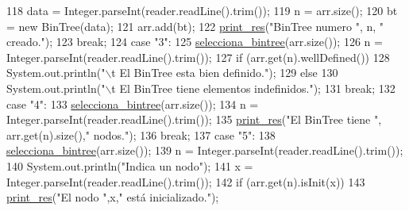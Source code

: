 \begin{DoxyCode}
118                         data = Integer.parseInt(reader.readLine().trim());
119                         n = arr.size();
120                         bt = \textcolor{keyword}{new} BinTree(data);
121                         arr.add(bt);
122                         \hyperlink{classdomini_1_1utils_1_1Driver____BinTree_a434e26afb3eb701558d81b0fd1c29dcb}{print\_res}(\textcolor{stringliteral}{"BinTree numero "}, n, \textcolor{stringliteral}{" creado."});
123                     \textcolor{keywordflow}{break};
124                     \textcolor{keywordflow}{case} \textcolor{stringliteral}{"3"}:
125                         \hyperlink{classdomini_1_1utils_1_1Driver____BinTree_a0d90bf2cb928174547e712140b5a4fe5}{selecciona\_bintree}(arr.size());
126                         n = Integer.parseInt(reader.readLine().trim());
127                         \textcolor{keywordflow}{if} (arr.get(n).wellDefined())
128                             System.out.println(\textcolor{stringliteral}{"\(\backslash\)t El BinTree esta bien definido."});
129                         \textcolor{keywordflow}{else} 
130                             System.out.println(\textcolor{stringliteral}{"\(\backslash\)t El BinTree tiene elementos indefinidos."});
131                     \textcolor{keywordflow}{break};
132                     \textcolor{keywordflow}{case} \textcolor{stringliteral}{"4"}:
133                         \hyperlink{classdomini_1_1utils_1_1Driver____BinTree_a0d90bf2cb928174547e712140b5a4fe5}{selecciona\_bintree}(arr.size());
134                         n = Integer.parseInt(reader.readLine().trim());
135                         \hyperlink{classdomini_1_1utils_1_1Driver____BinTree_a434e26afb3eb701558d81b0fd1c29dcb}{print\_res}(\textcolor{stringliteral}{"El BinTree tiene "}, arr.get(n).size(),\textcolor{stringliteral}{" nodos."});
136                     \textcolor{keywordflow}{break};
137                     \textcolor{keywordflow}{case} \textcolor{stringliteral}{"5"}:
138                         \hyperlink{classdomini_1_1utils_1_1Driver____BinTree_a0d90bf2cb928174547e712140b5a4fe5}{selecciona\_bintree}(arr.size());
139                         n = Integer.parseInt(reader.readLine().trim());
140                         System.out.println(\textcolor{stringliteral}{"Indica un nodo"});
141                         x = Integer.parseInt(reader.readLine().trim());
142                         \textcolor{keywordflow}{if} (arr.get(n).isInit(x))
143                             \hyperlink{classdomini_1_1utils_1_1Driver____BinTree_a434e26afb3eb701558d81b0fd1c29dcb}{print\_res}(\textcolor{stringliteral}{"El nodo "},x,\textcolor{stringliteral}{" está inicializado."});

\end{DoxyCode}
